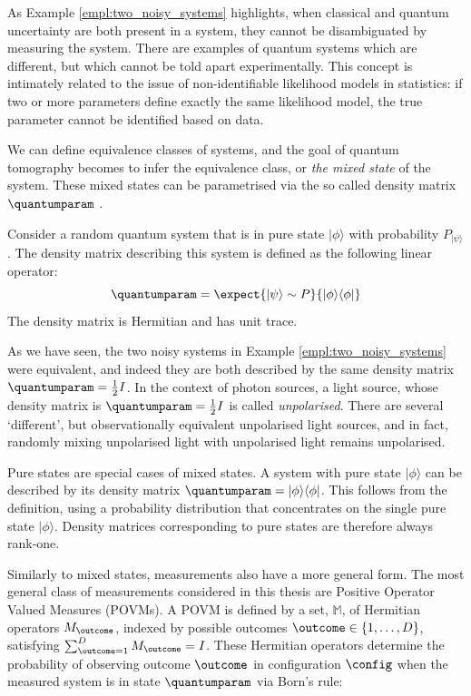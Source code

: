 As Example \ref{empl:two_noisy_systems} highlights, when classical and quantum uncertainty are both present in a system, they cannot be disambiguated by measuring the system. There are examples of quantum systems which are different, but which cannot be told apart experimentally. This concept is intimately related to the issue of non-identifiable likelihood models \citep{Teicher1961} in statistics: if two or more parameters define exactly the same likelihood model, the true parameter cannot be identified based on data.

We can define equivalence classes of systems, and the goal of quantum tomography becomes to infer the equivalence class, or \emph{the mixed state} of the system. These mixed states can be parametrised via the so called density matrix $\quantumparam$ \citep{Fano1957}.

\begin{definition}
Consider a random quantum system that is in pure state $\vert\phi\rangle$ with probability $P_{\vert\psi\rangle}$. The density matrix describing this system is defined as the following linear operator:
\begin{equation}
	\quantumparam = \expect{\vert\psi\rangle\sim P}{\vert\phi\rangle\langle\phi\vert}
\end{equation}
The density matrix is Hermitian and has unit trace.
\end{definition}

As we have seen, the two noisy systems in Example \ref{empl:two_noisy_systems} were equivalent, and indeed they are both described by the same density matrix $\quantumparam=\frac{1}{2}I$. In the context of photon sources, a light source, whose density matrix is $\quantumparam=\frac{1}{2}I$ is called \emph{unpolarised}. There are several `different', but observationally equivalent unpolarised light sources, and in fact, randomly mixing unpolarised light with unpolarised light remains unpolarised.

Pure states are special cases of mixed states. A system with pure state $\vert \phi \rangle$ can be described by its density matrix $\quantumparam = \vert \phi \rangle \langle \phi \vert$. This follows from the definition, using a probability distribution that concentrates on the single pure state $\vert \phi \rangle$. Density matrices corresponding to pure states are therefore always rank-one.

Similarly to mixed states, measurements also have a more general form. The most general class of measurements considered in this thesis are Positive Operator Valued Measures (POVMs). A POVM is defined by a set, $\mathbb{M}$, of Hermitian operators $M_{\outcome}$, indexed by possible outcomes $\outcome\in\{1,\ldots,D\}$, satisfying $\sum_{\outcome=1}^{D} M_{\outcome} = I$. These Hermitian operators determine the probability of observing outcome $\outcome$ in configuration $\config$ when the measured system is in state $\quantumparam$ via Born's rule:

